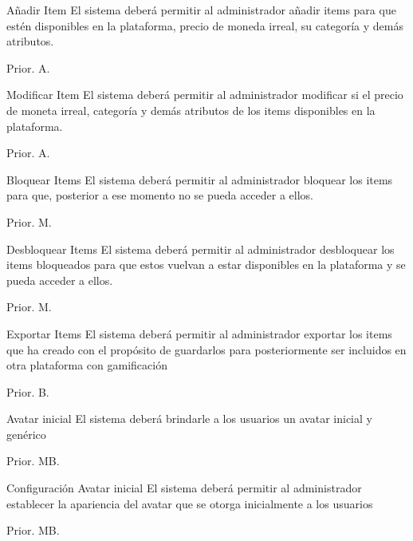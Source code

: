 \begin{RF}{Añadir Item}{%
    El sistema deberá permitir al administrador añadir items para que estén disponibles en la plataforma, precio de moneda irreal, su categoría y demás atributos. }
    \item[] Prior. A. %
\end{RF}

\begin{RF}{Modificar Item}{%
    El sistema deberá permitir al administrador modificar si el precio de moneta irreal, categoría y demás atributos de los items disponibles en la plataforma. }
    \item[] Prior. A. %
\end{RF}

\begin{RF}{Bloquear Items}{%
    El sistema deberá permitir al administrador bloquear los items para que, posterior a ese momento no se pueda acceder a ellos.}
    \item[] Prior. M. %
\end{RF}

\begin{RF}{Desbloquear Items}{%
    El sistema deberá permitir al administrador desbloquear los items bloqueados para que estos vuelvan a estar disponibles en la plataforma y se pueda acceder a ellos.}
    \item[] Prior. M. %
\end{RF}

\begin{RF}{Exportar Items}{%
    El sistema deberá permitir al administrador exportar los items que ha creado con el propósito de guardarlos para posteriormente ser incluidos en otra plataforma con gamificación}
    \item[] Prior. B. %
\end{RF}

\begin{RF}{Avatar inicial}{%
    El sistema deberá brindarle a los usuarios un avatar inicial y genérico}
    \item[] Prior. MB. %
\end{RF}

\begin{RF}{Configuración Avatar inicial}{%
    El sistema deberá permitir al administrador establecer la apariencia del avatar que se otorga inicialmente a los usuarios }
    \item[] Prior. MB. %
\end{RF}

